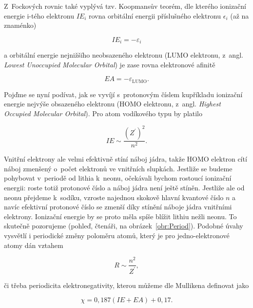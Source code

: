 \noindent Z~Fockových rovnic také vyplývá tzv. Koopmansův teorém, dle kterého ionizační energie i-tého elektronu $IE_i$ rovna orbitální energii příslušného elektronu $\epsilon_i$ (až na znaménko) 

\begin{equation}
IE_i = - \varepsilon_i
\label{rov:VE-58}
\end{equation}

\noindent a orbitální energie nejnižšího neobsazeného elektronu (LUMO elektronu, z~angl. \textit{Lowest Unoccupied Molecular Orbital}) je zase rovna elektronové afinitě

\begin{equation}
EA = -\varepsilon_{\mathrm{LUMO}}.
\label{rov:VE-59}
\end{equation}

Pojďme se nyní podívat, jak se vyvíjí s~protonovým číslem kupříkladu ionizační energie nejvýše obsazeného elektronu (HOMO elektronu, z~angl. \textit{Highest Occupied Molecular Orbital}). Pro atom vodíkového typu by platilo

\begin{equation}
IE \sim \frac{(Z^{\prime})^2}{n^2}.
\label{rov:VE-60}
\end{equation}

\noindent Vnitřní elektrony ale velmi efektivně stíní náboj jádra, takže HOMO elektron cítí náboj zmenšený o~počet elektronů ve vnitřních slupkách. Jestliže se budeme pohybovat v~periodě od lithia k~neonu, očekávali bychom rostoucí ionizační energii: roste totiž protonové číslo a náboj jádra není ještě stíněn. Jestliže ale od neonu přejdeme k~sodíku, vzroste najednou skokově hlavní kvantové číslo $n$ a navíc efektivní protonové číslo se zmenší díky stínění náboje jádra vnitřními elektrony. Ionizační energie by se proto měla spíše blížit lithiu nežli neonu. To skutečně pozorujeme (pohleď, čtenáři, na obrázek~\ref{obr:Period}). Podobné úvahy vysvětlí i periodické změny poloměru atomů, který je pro jedno-elektronové atomy dán vztahem

\begin{equation}
R \sim \frac{n^2}{Z^{\prime}},
\label{rov:VE-61}
\end{equation}

\noindent či třeba periodicita elektronegativity, kterou můžeme dle Mullikena definovat jako

\begin{equation}
\chi = 0{,}187 (IE + EA) + 0{,}17.
\label{rov:VE-62}
\end{equation}

